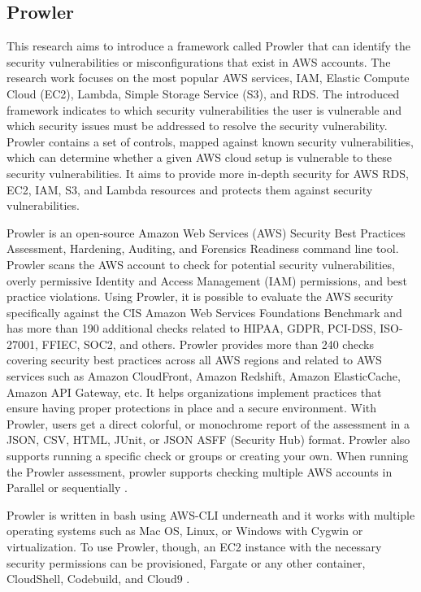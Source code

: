{\subsection{Prowler}

\par This research aims to introduce a framework called Prowler that can identify the security vulnerabilities or misconfigurations that exist in AWS accounts. The research work focuses on the most popular AWS services, IAM, Elastic Compute Cloud (EC2), Lambda, Simple Storage Service (S3), and RDS. The introduced framework indicates to which security vulnerabilities the user is vulnerable and which security issues must be addressed to resolve the security vulnerability. Prowler contains a set of controls, mapped against known security vulnerabilities, which can determine whether a given AWS cloud setup is vulnerable to these security vulnerabilities. It aims to provide more in-depth security for AWS RDS, EC2, IAM, S3, and Lambda resources and protects them against security vulnerabilities.

\par Prowler is an open-source Amazon Web Services (AWS) Security Best Practices Assessment, Hardening, Auditing, and Forensics Readiness command line tool. Prowler scans the AWS account to check for potential security vulnerabilities, overly permissive Identity and Access Management (IAM) permissions, and best practice violations. Using Prowler, it is possible to evaluate the AWS security specifically against the CIS Amazon Web Services Foundations Benchmark and has more than 190 additional checks related to HIPAA, GDPR, PCI-DSS, ISO-27001, FFIEC, SOC2, and others. Prowler provides more than 240 checks covering security best practices across all AWS regions and related to AWS services such as Amazon CloudFront, Amazon Redshift, Amazon ElasticCache, Amazon API Gateway, etc. It helps organizations implement practices that ensure having proper protections in place and a secure environment. With Prowler, users get a direct colorful, or monochrome report of the assessment in a JSON, CSV, HTML, JUnit, or JSON ASFF (Security Hub) format. Prowler also supports running a specific check or groups or creating your own. When running the Prowler assessment, prowler supports checking multiple AWS accounts in Parallel or sequentially \cite{90}.

\par Prowler is written in bash using AWS-CLI underneath and it works with multiple operating systems such as Mac OS, Linux, or Windows with Cygwin or virtualization. To use Prowler, though, an EC2 instance with the necessary security permissions can be provisioned, Fargate or any other container, CloudShell, Codebuild, and Cloud9 \cite{30}.

}
